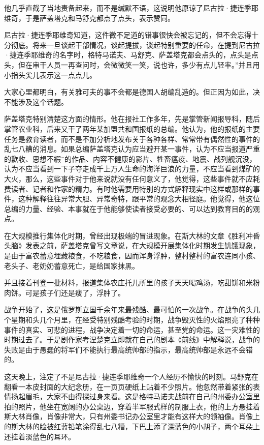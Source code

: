 他几乎直截了当地责备起来，而不是缄默不语，这说明他原谅了尼古拉·捷连季耶维奇，于是萨盖塔克和马舒克都点了点头，表示赞同。

尼古拉·捷连季耶维奇知道，这件微不足道的错事很快会被忘记的，但不会忘得十分彻底。将来一旦谈起干部情况，谈起提拔，谈起特别重要的任命，在提到尼古拉·捷连季耶维奇的名字时，格特马诺夫、马舒克、萨盖塔克都会点头的，点头是点头，但在审干人员一再查问时，会微微笑一笑，说也许，多少有点儿轻率。”并且用小指头尖儿表示这一点点儿。

大家心里都明白，有关雅可夫的事不会都是德国人胡编乱造的。但正因为如此，决不能涉及这个话题。

萨盖塔克特别清楚这方面的情形。他在报社工作多年，先是掌管新闻报导科，随后掌管农业科，后来又干了两年某加盟共和国报纸的总编。他认为，他的报纸的主要任务是教育读者，而不是不加分析地发布关于各种各样、常常带有偶然性的事件的乱七八糟的消息。如果总编萨盖塔克认为应当避开某一事件，认为不应当报道严重的歉收、思想不縀¯的作品、内容不健康的影片、牲畜瘟疫、地震、战列舰沉没，认为不应当看到一下子夺走成千上万人生命的海洋巨浪的力量，不应当看到煤矿的大火，那么，这些事件对于他来说就没有任何意义了，他觉得，这些事件就不应耗费读者、记者和作家的精力。有时他需要用特别的方式解释现实中这样或那样的事件，这种解释往往异常大胆、异常奇特，跟平常的观念大相径庭。他觉得，他这位总编的力量、经验、本事就在于他能够使读者接受必要的、可以达到教育目的的观点。

在大规模推行集体化时期，曾经出现极端的冒进现象。在斯大林的文章《胜利冲昏头脑》发表之前，萨盖塔克曾写文章说，在大规模开展集体化时期发生饥饿现象，是由于富农蓄意埋藏粮食，不吃粮食，因而浑身浮肿，整村整村的富农连同小孩、老头子、老奶奶蓄意死亡，是给国家抹黑。

并且接着刊登一批材料，报道集体农庄托儿所里的孩子天天喝鸡汤，吃甜饼和米粉肉饼。可是孩子们还是瘦了，浮肿了。

战争开始了，这是俄罗斯立国千余年来最残酷、最可怕的一次战争。在战争的头几个星期和头几个月里，在经受特别残酷考验的时期，战争毁灭性的火焰照亮了种种事件的真实、可悲的进程，战争决定着一切的命运，甚至党的命运。这一灾难性的时期过去了。于是剧作家考涅楚克立即就在自己的剧本《前线》中解释说，战争的失败是由于愚蠢的将军们不能执行最高统帅部的指示，最高统帅部是永远不会错的。

这天晚上，注定了不是尼古拉·捷连季耶维奇一个人经历不愉快的时刻。马舒克在翻看一本皮封面的大纪念册，在一页页硬纸上贴着不少照片。他忽然带着紧张的表情扬起眉毛，大家不由得探过身来看。这是格特马诺夫战前在自己的州委办公室里拍的照片，他坐在宽阔的办公桌边，穿着半军服式样的制服上衣，他的上方悬挂着斯大林肖像，肖像非常大，只有州委书记办公室里才能有这样大的领袖像。肖像上的斯大林的脸被红蓝铅笔涂得乱七八糟，下巴上添了深蓝色的小胡子，两个耳朵上还挂着淡蓝色的耳环。

